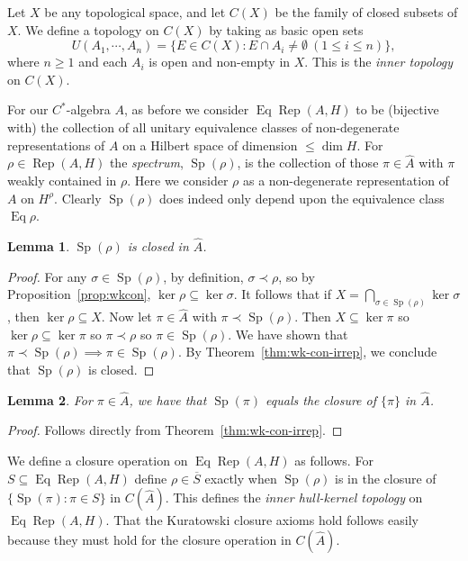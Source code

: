\documentclass[a4paper,11pt]{article}
\newcommand{\Rep}{\operatorname{Rep}}
\newcommand{\Eq}{\operatorname{Eq}}
\newcommand{\Sp}{\operatorname{Sp}}
\newtheorem{lemma}{Lemma}
\begin{document}
Let $X$ be any topological space, and let $C(X)$ be the family of closed subsets
of $X$.  We define a topology on $C(X)$ by taking as basic open sets
\[ U(A_1,\cdots,A_n) = \{ E\in C(X) : E \cap A_i\not=\emptyset \ (1 \leq i
\leq n) \}, \]
where $n\geq 1$ and each $A_i$ is open and non-empty in $X$.  This is the
\emph{inner topology} on $C(X)$.

For our $C^*$-algebra $A$, as before we consider $\Eq\Rep(A,H)$ to be (bijective
with) the collection of all unitary equivalence classes of non-degenerate
representations of $A$ on a Hilbert space of dimension $\leq\dim H$.  For
$\rho\in\Rep(A,H)$ the \emph{spectrum}, $\Sp(\rho)$, is the collection of those
$\pi\in\hat A$ with $\pi$ weakly contained in $\rho$.  Here we consider $\rho$
as a non-degenerate representation of $A$ on $H^\rho$.  Clearly $\Sp(\rho)$ does 
indeed only depend upon the equivalence class $\Eq\rho$.

\begin{lemma}
$\Sp(\rho)$ is closed in $\hat A$.
\end{lemma}
\begin{proof}
For any $\sigma\in\Sp(\rho)$, by definition, $\sigma\prec\rho$, so by
Proposition~\ref{prop:wkcon}, $\ker\rho \subseteq\ker\sigma$.  It follows
that if $X = \bigcap_{\sigma\in\Sp(\rho)} \ker \sigma$, then $\ker\rho \subseteq
X$.  Now let $\pi\in\hat A$ with $\pi\prec\Sp(\rho)$.  Then $X\subseteq\ker\pi$
so $\ker\rho \subseteq\ker\pi$ so $\pi\prec\rho$ so $\pi\in\Sp(\rho)$.  We have
shown that $\pi\prec\Sp(\rho) \implies \pi\in\Sp(\rho)$.  By 
Theorem~\ref{thm:wk-con-irrep}, we conclude that $\Sp(\rho)$ is closed.
\end{proof}

\begin{lemma}\label{lem:supp_in_dual_A}
For $\pi\in\hat A$, we have that $\Sp(\pi)$ equals the closure of $\{\pi\}$
in $\hat A$.
\end{lemma}
\begin{proof}
Follows directly from Theorem~\ref{thm:wk-con-irrep}.
\end{proof}

We define a closure operation on $\Eq\Rep(A,H)$ as follows.  For $S\subseteq
\Eq\Rep(A,H)$ define $\rho\in\overline{S}$ exactly when $\Sp(\rho)$ is in the
closure of $\{\Sp(\pi) : \pi\in S\}$ in $C(\hat A)$.  This defines the
\emph{inner hull-kernel topology} on $\Eq\Rep(A,H)$.  That the Kuratowski
closure axioms hold follows easily because they must hold for the closure
operation in $C(\hat A)$.
\end{document}
